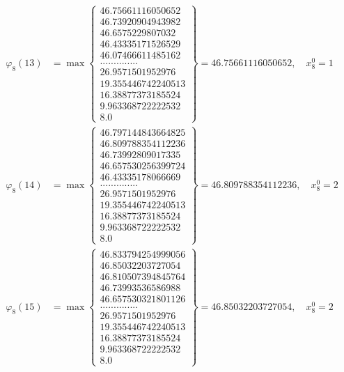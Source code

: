 \documentclass{article}
\begin{document}
\begin{align*}
  
  
  
\varphi_{8}(13) &= \max \left\{ \begin{array}{c}
46.75661116050652 \\
 46.73920904943982 \\
 46.6575229807032 \\
 46.43335171526529 \\
 46.07466611485162 \\
 .............. \\
 26.9571501952976 \\
 19.355446742240513 \\
 16.38877373185524 \\
 9.963368722222532 \\
 8.0
\end{array} \right\} = 46.75661116050652, \quad x_{8}^0 = 1\\
  
  
  
  
\varphi_{8}(14) &= \max \left\{ \begin{array}{c}
46.797144843664825 \\
 46.809788354112236 \\
 46.73992809017335 \\
 46.657530256399724 \\
 46.43335178066669 \\
 .............. \\
 26.9571501952976 \\
 19.355446742240513 \\
 16.38877373185524 \\
 9.963368722222532 \\
 8.0
\end{array} \right\} = 46.809788354112236, \quad x_{8}^0 = 2\\
  
  
  
  
\varphi_{8}(15) &= \max \left\{ \begin{array}{c}
46.833794254999056 \\
 46.85032203727054 \\
 46.810507394845764 \\
 46.73993536586988 \\
 46.657530321801126 \\
 .............. \\
 26.9571501952976 \\
 19.355446742240513 \\
 16.38877373185524 \\
 9.963368722222532 \\
 8.0
\end{array} \right\} = 46.85032203727054, \quad x_{8}^0 = 2\\
  

\end{align*}
\end{document}
